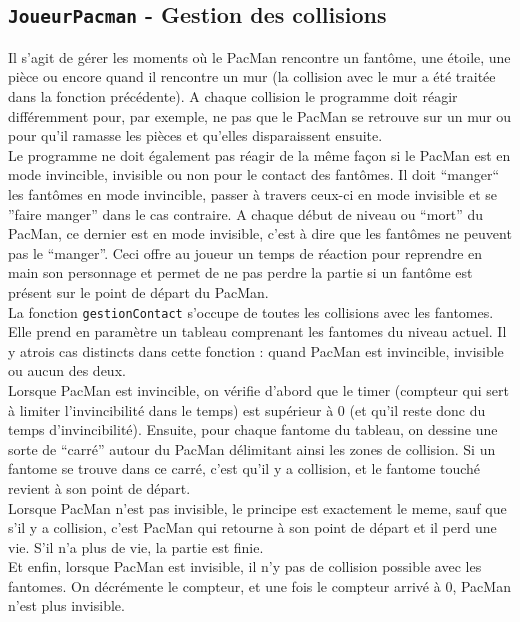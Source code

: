       \subsection*{\texttt{JoueurPacman} - Gestion des collisions}
	Il s'agit de gérer les moments où le PacMan rencontre un fantôme, une étoile, une pièce ou encore quand il rencontre un mur (la collision avec le mur a été traitée dans la fonction 
	précédente). A chaque collision le programme doit réagir différemment pour, par exemple, ne pas que le PacMan se retrouve sur un mur ou pour qu'il ramasse les pièces et qu'elles 
	disparaissent ensuite.\\
	Le programme ne doit également pas réagir de la même façon si le PacMan est en mode invincible, invisible ou non pour le contact des fantômes. Il doit ``manger`` les fantômes en mode 
	invincible, passer à travers ceux-ci en mode invisible et se ''faire manger'' dans le cas contraire. A chaque début de niveau ou ``mort'' du PacMan, ce dernier est en mode invisible,
	c'est à dire que les fantômes ne peuvent pas le ``manger''. Ceci offre au joueur un temps de réaction pour reprendre en main son personnage et permet de ne pas perdre la partie si un 
	fantôme	est présent sur le point de départ du PacMan.\\
	La fonction \texttt{gestionContact} s'occupe de toutes les collisions avec les fantomes. Elle prend en paramètre un tableau comprenant les fantomes du niveau actuel. Il y atrois cas 
	distincts dans cette fonction : quand PacMan est invincible, invisible ou aucun des deux.\\
	Lorsque PacMan est invincible, on vérifie d'abord que le timer (compteur qui sert à limiter l'invincibilité dans le temps) est supérieur à 0 (et qu'il reste donc du temps d'invincibilité).
	Ensuite, pour chaque fantome du tableau, on dessine une sorte de ``carré'' autour du PacMan délimitant ainsi les zones de collision. Si un fantome se trouve dans ce carré, c'est qu'il y a
	collision, et le fantome touché revient à son point de départ.\\
	Lorsque PacMan n'est pas invisible, le principe est exactement le meme, sauf que s'il y a collision, c'est PacMan qui retourne à son point de départ et il perd une vie. S'il n'a plus de vie,
	la partie est finie.\\
	Et enfin, lorsque PacMan est invisible, il n'y pas de collision possible avec les fantomes. On décrémente le compteur, et une fois le compteur arrivé à 0, PacMan n'est plus invisible. \\
	

